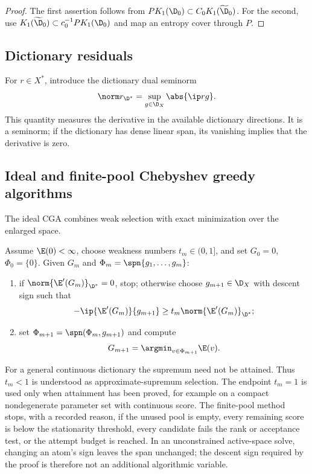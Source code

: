 \begin{proof}
The first assertion follows from
\(PK_1(\D_0)\subset C_0K_1(\widetilde\D_0)\). For the second, use
\(K_1(\widetilde\D_0)\subset c_0^{-1}PK_1(\D_0)\) and map an entropy cover through \(P\).
\end{proof}

\subsection{Dictionary residuals}

For \(r\in X^*\), introduce the dictionary dual seminorm
\[
  \norm r_{\D^*}=\sup_{g\in\D_X}\abs{\ip r g}.
\]
This quantity measures the derivative in the available dictionary directions. It is a seminorm;
if the dictionary has dense linear span, its vanishing implies that the derivative is zero.

\subsection{Ideal and finite-pool Chebyshev greedy algorithms}

The ideal CGA combines weak selection with exact minimization over the enlarged space.

\begin{algorithm}[htbp]
\caption{Continuous weak Chebyshev greedy algorithm}
\label{alg:continuous}
Assume \(\E(0)<\infty\), choose weakness numbers \(t_m\in(0,1]\), and set
\(G_0=0\), \(\Phi_0=\{0\}\). Given
\(G_m\) and \(\Phi_m=\spn\{g_1,\ldots,g_m\}\):
\begin{enumerate}[label=\textup{(\roman*)}]
  \item if \(\norm{\E'(G_m)}_{\D^*}=0\), stop; otherwise choose \(g_{m+1}\in\D_X\) with descent sign such that
  \[
  -\ip{\E'(G_m)}{g_{m+1}}
  \geq t_m\norm{\E'(G_m)}_{\D^*};
  \]
  \item set \(\Phi_{m+1}=\spn(\Phi_m,g_{m+1})\) and compute
  \[
    G_{m+1}=\argmin_{v\in\Phi_{m+1}}\E(v).
  \]
\end{enumerate}
\end{algorithm}

For a general continuous dictionary the supremum need not be attained. Thus \(t_m<1\) is understood as
approximate-supremum selection. The endpoint \(t_m=1\) is used only when attainment has been proved,
for example on a compact nondegenerate parameter set with continuous score. The finite-pool method
stops, with a recorded reason, if the unused pool is empty, every remaining score is below the
stationarity threshold, every candidate fails the rank or acceptance test, or the attempt budget is
reached. In an unconstrained active-space solve, changing an atom's sign leaves the span unchanged;
the descent sign required by the proof is therefore not an additional algorithmic variable.

